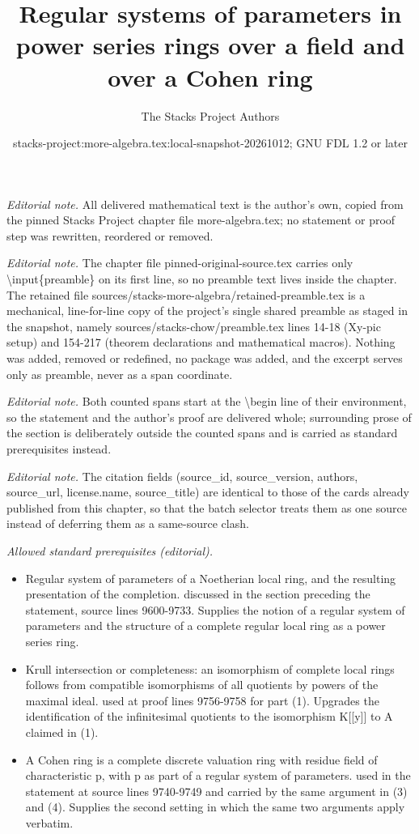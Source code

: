 \documentclass[10pt,a4paper]{amsart}
\title{Regular systems of parameters in power series rings over a field and over a Cohen ring}
\author{The Stacks Project Authors}
\date{stacks-project:more-algebra.tex:local-snapshot-20261012; GNU FDL 1.2 or later}
\theoremstyle{plain}
\theoremstyle{definition}
\theoremstyle{remark}
\numberwithin{equation}{subsection}
\begin{document}
\maketitle
\setcounter{subsection}{1}
\noindent\textit{Editorial note.} All delivered mathematical text is the author's own, copied from the pinned Stacks Project chapter file more-algebra.tex; no statement or proof step was rewritten, reordered or removed.\par\medskip
\noindent\textit{Editorial note.} The chapter file pinned-original-source.tex carries only \textbackslash{}input\{preamble\} on its first line, so no preamble text lives inside the chapter. The retained file sources/stacks-more-algebra/retained-preamble.tex is a mechanical, line-for-line copy of the project's single shared preamble as staged in the snapshot, namely sources/stacks-chow/preamble.tex lines 14-18 (Xy-pic setup) and 154-217 (theorem declarations and mathematical macros). Nothing was added, removed or redefined, no package was added, and the excerpt serves only as preamble, never as a span coordinate.\par\medskip
\noindent\textit{Editorial note.} Both counted spans start at the \textbackslash{}begin line of their environment, so the statement and the author's proof are delivered whole; surrounding prose of the section is deliberately outside the counted spans and is carried as standard prerequisites instead.\par\medskip
\noindent\textit{Editorial note.} The citation fields (source\_id, source\_version, authors, source\_url, license.name, source\_title) are identical to those of the cards already published from this chapter, so that the batch selector treats them as one source instead of deferring them as a same-source clash.\par\medskip
\noindent\textit{Allowed standard prerequisites (editorial).}\begin{itemize}
\item Regular system of parameters of a Noetherian local ring, and the resulting presentation of the completion. discussed in the section preceding the statement, source lines 9600-9733. Supplies the notion of a regular system of parameters and the structure of a complete regular local ring as a power series ring.
\item Krull intersection or completeness: an isomorphism of complete local rings follows from compatible isomorphisms of all quotients by powers of the maximal ideal. used at proof lines 9756-9758 for part (1). Upgrades the identification of the infinitesimal quotients to the isomorphism K[[y]] to A claimed in (1).
\item A Cohen ring is a complete discrete valuation ring with residue field of characteristic p, with p as part of a regular system of parameters. used in the statement at source lines 9740-9749 and carried by the same argument in (3) and (4). Supplies the second setting in which the same two arguments apply verbatim.
\end{itemize}\medskip
\end{document}
